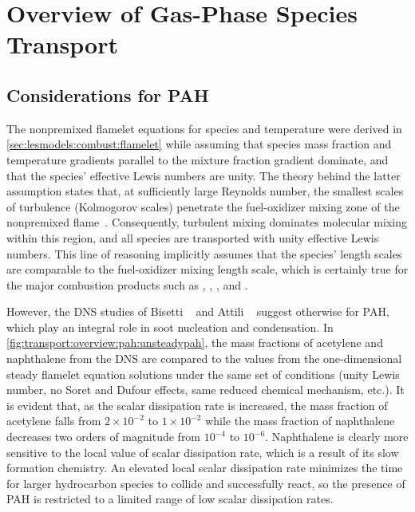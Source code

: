 \section{Overview of Gas-Phase Species Transport}
\label{sec:transport:overview}




\subsection{Considerations for PAH}
\label{sec:transport:overview:pah}

The nonpremixed flamelet equations for species and temperature were derived in \cref{sec:lesmodels:combust:flamelet} while assuming that species mass fraction and temperature gradients parallel to the mixture fraction gradient dominate, and that the species' effective Lewis numbers are unity. The theory behind the latter assumption states that, at sufficiently large Reynolds number, the smallest scales of turbulence (Kolmogorov scales) penetrate the fuel-oxidizer mixing zone of the nonpremixed flame~\cite{peters1984}. Consequently, turbulent mixing dominates molecular mixing within this region, and all species are transported with unity effective Lewis numbers. This line of reasoning implicitly assumes that the species' length scales are comparable to the fuel-oxidizer mixing length scale, which is certainly true for the major combustion products such as , , , and .

However, the DNS studies of Bisetti \etal~\cite{bisetti2012} and Attili \etal~\cite{attili2014} suggest otherwise for PAH, which play an integral role in soot nucleation and condensation. In \cref{fig:transport:overview:pah:unsteadypah}, the mass fractions of acetylene and naphthalene from the DNS are compared to the values from the one-dimensional steady flamelet equation solutions under the same set of conditions (unity Lewis number, no Soret and Dufour effects, same reduced chemical mechanism, etc.). It is evident that, as the scalar dissipation rate is increased, the mass fraction of acetylene falls from $2 \times 10^{-2}$ to $1 \times 10^{-2}$ while the mass fraction of naphthalene decreases two orders of magnitude from $10^{-4}$ to $10^{-6}$. Naphthalene is clearly more sensitive to the local value of scalar dissipation rate, which is a result of its slow formation chemistry. An elevated local scalar dissipation rate minimizes the time for larger hydrocarbon species to collide and successfully react, so the presence of PAH is restricted to a limited range of low scalar dissipation rates.

